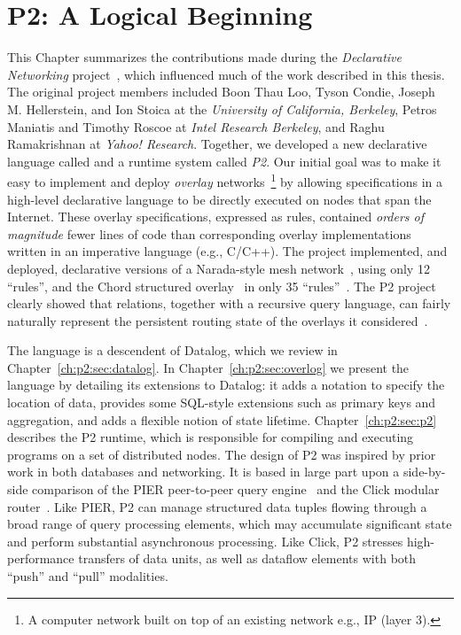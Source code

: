 \chapter[P2: A Logical Beginning]{P2: A Logical Beginning}
\label{ch:p2}

This Chapter summarizes the contributions made during the {\em Declarative
Networking} project~\cite{boon-thesis}, which influenced much of the work
described in this thesis.  The original project members included Boon Thau Loo,
Tyson Condie, Joseph M.  Hellerstein, and Ion Stoica at the {\em University of
California, Berkeley}, Petros Maniatis and Timothy Roscoe at {\em Intel
Research Berkeley}, and Raghu Ramakrishnan at {\em Yahoo!  Research}.
Together, we developed a new declarative language called {\em \OVERLOG} and a
runtime system called {\em P2}.  Our initial goal was to make it easy to
implement and deploy {\em overlay} networks~\footnote{A computer network built
on top of an existing network e.g., IP (layer 3).} by allowing specifications
in a high-level declarative language to be directly executed on nodes that span
the Internet.  These overlay specifications, expressed as \OVERLOG rules,
contained {\em orders of magnitude} fewer lines of code than corresponding
overlay implementations written in an imperative language (e.g., C/C++).  The
project implemented, and deployed, declarative versions of a Narada-style mesh
network~\cite{chu00case}, using only 12 ``rules'', and the Chord structured
overlay~\cite{chord} in only 35 ``rules''~\cite{p2:sosp}.  The P2 project
clearly showed that relations, together with a recursive query language, can
fairly naturally represent the persistent routing state of the overlays it
considered~\cite{boon-thesis}.

The \OVERLOG language is a descendent of Datalog, which we review in
Chapter~\ref{ch:p2:sec:datalog}.  In Chapter~\ref{ch:p2:sec:overlog} we present
the \OVERLOG language by detailing its extensions to Datalog: it adds a
notation to specify the location of data, provides some SQL-style extensions
such as primary keys and aggregation, and adds a flexible notion of state
lifetime.  Chapter~\ref{ch:p2:sec:p2} describes the P2 runtime, which is
responsible for compiling and executing \OVERLOG programs on a set of
distributed nodes.  The design of P2 was inspired by prior work in both
databases and networking.  It is based in large part upon a side-by-side
comparison of the PIER peer-to-peer query engine~\cite{pier-cidr05} and the
Click modular router~\cite{click-tocs}.  Like PIER, P2 can manage structured
data tuples flowing through a broad range of query processing elements, which
may accumulate significant state and perform substantial asynchronous
processing.  Like Click, P2 stresses high-performance transfers of data units,
as well as dataflow elements with both ``push'' and ``pull'' modalities.

